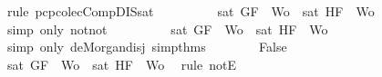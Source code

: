\begin{isabellebody}
\ {\isacharparenleft}rule\ pcp{\isacharunderscore}colecComp{\isacharunderscore}DIS{\isacharunderscore}sat{\isacharparenright}\isanewline
\ \ \ \ \ \ \isamarkupfalse%
\ \isamarkupfalse%
\ {\isachardoublequoteopen}{\isasymnot}{\isasymnot}{\isacharparenleft}sat\ {\isacharparenleft}{\isacharbraceleft}G{\isacharcomma}F{\isacharbraceright}\ {\isasymunion}\ {\isacharquery}Wo{\isacharparenright}\ {\isasymor}\ sat\ {\isacharparenleft}{\isacharbraceleft}H{\isacharcomma}F{\isacharbraceright}\ {\isasymunion}\ {\isacharquery}Wo{\isacharparenright}{\isacharparenright}{\isachardoublequoteclose}\isanewline
\ \ \ \ \ \ \ \ \isamarkupfalse%
\ {\isacharparenleft}simp\ only{\isacharcolon}\ not{\isacharunderscore}not{\isacharparenright}\isanewline
\ \ \ \ \ \ \isamarkupfalse%
\ \isamarkupfalse%
\ {\isachardoublequoteopen}{\isasymnot}{\isacharparenleft}{\isasymnot}{\isacharparenleft}sat\ {\isacharparenleft}{\isacharbraceleft}G{\isacharcomma}F{\isacharbraceright}\ {\isasymunion}\ {\isacharquery}Wo{\isacharparenright}{\isacharparenright}\ {\isasymand}\ {\isasymnot}{\isacharparenleft}sat\ {\isacharparenleft}{\isacharbraceleft}H{\isacharcomma}F{\isacharbraceright}\ {\isasymunion}\ {\isacharquery}Wo{\isacharparenright}{\isacharparenright}{\isacharparenright}{\isachardoublequoteclose}\isanewline
\ \ \ \ \ \ \ \ \isamarkupfalse%
\ {\isacharparenleft}simp\ only{\isacharcolon}\ de{\isacharunderscore}Morgan{\isacharunderscore}disj\ simp{\isacharunderscore}thms{\isacharparenleft}{}{\isacharparenright}{\isacharparenright}\isanewline
\ \ \ \ \ \ \isamarkupfalse%
\ {\isachardoublequoteopen}False{\isachardoublequoteclose}\isanewline
\ \ \ \ \ \ \ \ \isamarkupfalse%
\ {\isacartoucheopen}{\isasymnot}{\isacharparenleft}sat\ {\isacharparenleft}{\isacharbraceleft}G{\isacharcomma}F{\isacharbraceright}\ {\isasymunion}\ {\isacharquery}Wo{\isacharparenright}{\isacharparenright}\ {\isasymand}\ {\isasymnot}{\isacharparenleft}sat\ {\isacharparenleft}{\isacharbraceleft}H{\isacharcomma}F{\isacharbraceright}\ {\isasymunion}\ {\isacharquery}Wo{\isacharparenright}{\isacharparenright}{\isacartoucheclose}\ \isamarkupfalse%
\ {\isacharparenleft}rule\ notE{\isacharparenright}\isanewline
\ \ \ \ \isamarkupfalse%
\isanewline
\ \ \isamarkupfalse%
\isanewline
{}\isamarkupfalse%
%
\endisatagproof
{\isafoldproof}%
%
\isadelimproof
%
\endisadelimproof
%
\begin{isamarkuptext}%

\end{isamarkuptext}
\end{isabellebody}
